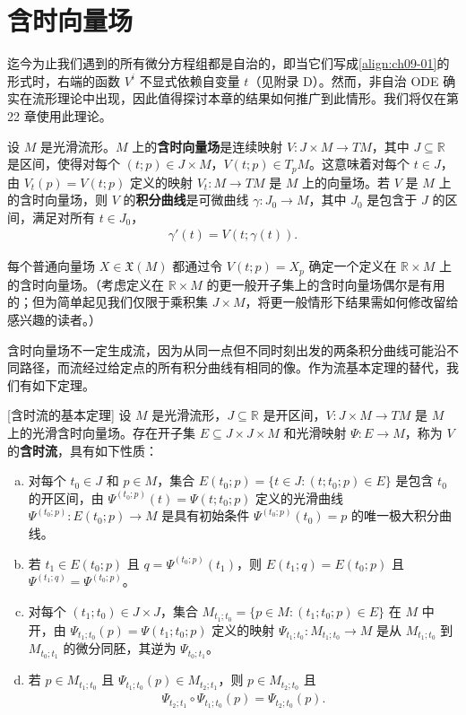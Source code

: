 \documentclass[../../main.tex]{subfiles}
\begin{document}
\section{含时向量场}\label{section:ch09-含时向量场}

迄今为止我们遇到的所有微分方程组都是自治的，即当它们写成\eqref{align:ch09-01}的形式时，右端的函数 $V^i$ 不显式依赖自变量 $t$（见附录 D）。然而，非自治 ODE 确实在流形理论中出现，因此值得探讨本章的结果如何推广到此情形。我们将仅在第 22 章使用此理论。

设 $M$ 是光滑流形。$M$ 上的\textbf{含时向量场}是连续映射 $V\colon J\times M\to TM$，其中 $J\subseteq\mathbb{R}$ 是区间，使得对每个 $(t;p)\in J\times M$，$V(t;p)\in T_pM$。这意味着对每个 $t\in J$，由 $V_t(p)=V(t;p)$ 定义的映射 $V_t\colon M\to TM$ 是 $M$ 上的向量场。若 $V$ 是 $M$ 上的含时向量场，则 $V$ 的\textbf{积分曲线}是可微曲线 $\gamma\colon J_0\to M$，其中 $J_0$ 是包含于 $J$ 的区间，满足对所有 $t\in J_0$，
\begin{align*}
\gamma'(t)=V(t;\gamma(t)).
\end{align*}

每个普通向量场 $X\in\mathfrak{X}(M)$ 都通过令 $V(t;p)=X_p$ 确定一个定义在 $\mathbb{R}\times M$ 上的含时向量场。（考虑定义在 $\mathbb{R}\times M$ 的更一般开子集上的含时向量场偶尔是有用的；但为简单起见我们仅限于乘积集 $J\times M$，将更一般情形下结果需如何修改留给感兴趣的读者。）

含时向量场不一定生成流，因为从同一点但不同时刻出发的两条积分曲线可能沿不同路径，而流经过给定点的所有积分曲线有相同的像。作为流基本定理的替代，我们有如下定理。

\begin{theorem}\label{theorem:ch09-48}[含时流的基本定理]
设 $M$ 是光滑流形，$J\subseteq\mathbb{R}$ 是开区间，$V\colon J\times M\to TM$ 是 $M$ 上的光滑含时向量场。存在开子集 $E\subseteq J\times J\times M$ 和光滑映射 $\Psi\colon E\to M$，称为 $V$ 的\textbf{含时流}，具有如下性质：
\begin{enumerate}[(a)]
\item 对每个 $t_0\in J$ 和 $p\in M$，集合 $E(t_0;p)=\{t\in J:(t;t_0;p)\in E\}$ 是包含 $t_0$ 的开区间，由 $\Psi^{(t_0;p)}(t)=\Psi(t;t_0;p)$ 定义的光滑曲线 $\Psi^{(t_0;p)}\colon E(t_0;p)\to M$ 是具有初始条件 $\Psi^{(t_0;p)}(t_0)=p$ 的唯一极大积分曲线。
\item 若 $t_1\in E(t_0;p)$ 且 $q=\Psi^{(t_0;p)}(t_1)$，则 $E(t_1;q)=E(t_0;p)$ 且 $\Psi^{(t_1;q)}=\Psi^{(t_0;p)}$。
\item 对每个 $(t_1;t_0)\in J\times J$，集合 $M_{t_1;t_0}=\{p\in M:(t_1;t_0;p)\in E\}$ 在 $M$ 中开，由 $\Psi_{t_1;t_0}(p)=\Psi(t_1;t_0;p)$ 定义的映射 $\Psi_{t_1;t_0}\colon M_{t_1;t_0}\to M$ 是从 $M_{t_1;t_0}$ 到 $M_{t_0;t_1}$ 的微分同胚，其逆为 $\Psi_{t_0;t_1}$。
\item 若 $p\in M_{t_1;t_0}$ 且 $\Psi_{t_1;t_0}(p)\in M_{t_2;t_1}$，则 $p\in M_{t_2;t_0}$ 且
\begin{align}
\Psi_{t_2;t_1}\circ\Psi_{t_1;t_0}(p)=\Psi_{t_2;t_0}(p). \label{align:ch09-18}
\end{align}
\end{enumerate}
\end{theorem}
\end{document}
